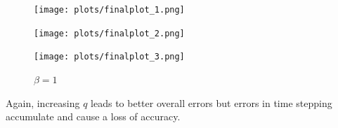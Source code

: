 \documentclass{article}
\begin{document}
\begin{figure}[H]
  \centering
  \begin{minipage}{.4\textwidth}
    \centering
    \texttt{[image: plots/finalplot\_1.png]}
  	\caption{$\beta = 0$}
    \label{fig:beta0}
  \end{minipage}%
  \begin{minipage}{.4\textwidth}
    \centering
    \texttt{[image: plots/finalplot\_2.png]}
  	\caption{$\beta = 0.5$}
    \label{fig:beta1}
  \end{minipage}%
  \begin{minipage}{.4\textwidth}
    \centering
    \texttt{[image: plots/finalplot\_3.png]}
  	\caption{$\beta = 1$}
    \label{fig:beta2}
  \end{minipage}%
\end{figure}

\noindent Again, increasing $q$ leads to better overall errors but errors in time stepping accumulate and cause a loss of accuracy. 
\end{document}

